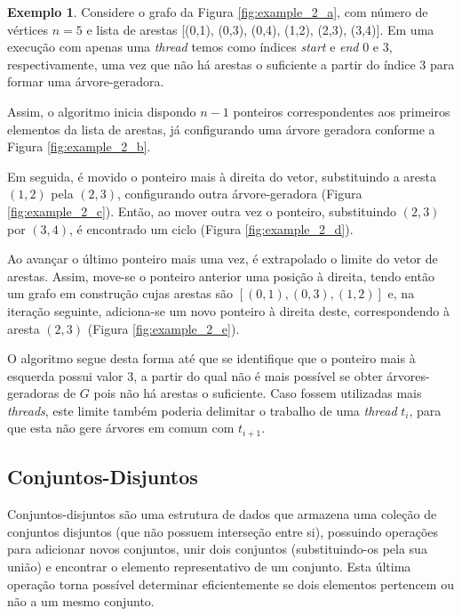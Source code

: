 \documentclass[article,a4paper,12pt,brazil,sumario=tradicional]{abntex2}
\theoremstyle{definition} %
\newtheorem{example}{Exemplo}
\begin{document}
\begin{example}

Considere o grafo da Figura \ref{fig:example_2_a}, com número de vértices $n=5$ e lista de arestas [(0,1), (0,3), (0,4), (1,2), (2,3), (3,4)]. Em uma execução com apenas uma \textit{thread} temos como índices \textit{start} e \textit{end} 0 e 3, respectivamente, uma vez que não há arestas o suficiente a partir do índice $3$ para formar uma árvore-geradora.

Assim, o algoritmo inicia dispondo $n - 1$ ponteiros correspondentes aos primeiros elementos da lista de arestas, já configurando uma árvore geradora conforme a Figura \ref{fig:example_2_b}.

Em seguida, é movido o ponteiro mais à direita do vetor, substituindo a aresta $(1,2)$ pela $(2,3)$, configurando outra árvore-geradora (Figura \ref{fig:example_2_c}). Então, ao mover outra vez o ponteiro, substituindo $(2,3)$ por $(3,4)$, é encontrado um ciclo (Figura \ref{fig:example_2_d}).

Ao avançar o último ponteiro mais uma vez, é extrapolado o limite do vetor de arestas. Assim, move-se o ponteiro anterior uma posição à direita, tendo então um grafo em construção cujas arestas são $[(0,1),(0,3),(1,2)]$ e, na iteração seguinte, adiciona-se um novo ponteiro à direita deste, correspondendo à aresta $(2,3)$ (Figura \ref{fig:example_2_e}).

O algoritmo segue desta forma até que se identifique que o ponteiro mais à esquerda possui valor $3$, a partir do qual não é mais possível se obter árvores-geradoras de $G$ pois não há arestas o suficiente. Caso fossem utilizadas mais \textit{threads}, este limite também poderia delimitar o trabalho de uma \textit{thread} $t_i$, para que esta não gere árvores em comum com $t_{i+1}$.

\end{example}

\subsection{Conjuntos-Disjuntos}
\label{conjuntos-disjuntos}

Conjuntos-disjuntos são uma estrutura de dados que armazena uma coleção de conjuntos disjuntos (que não possuem interseção entre si), possuindo operações para adicionar novos conjuntos, unir dois conjuntos (substituindo-os pela sua união) e encontrar o elemento representativo de um conjunto. Esta última operação torna possível determinar eficientemente se dois elementos pertencem ou não a um mesmo conjunto.
\end{document}
